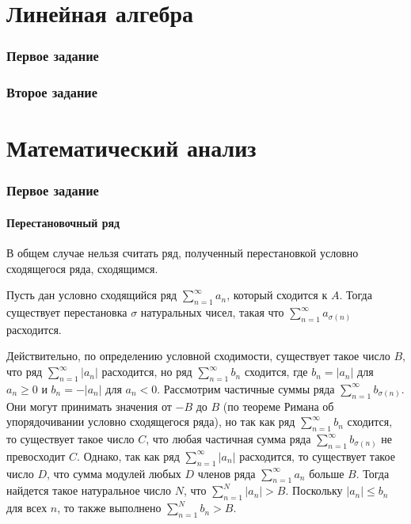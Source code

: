 \documentclass[a4paper, 14pt]{article}
\begin{document}
    \tableofcontents

     \part*{Линейная алгебра}

     \section*{Первое задание}

    

    \section*{Второе задание}

    

     \part*{Математический анализ}

    \section*{Первое задание} 

     \subsection*{Перестановочный ряд}

    В общем случае нельзя считать ряд, полученный перестановкой условно сходящегося ряда, сходящимся.

    Пусть дан условно сходящийся ряд $\sum_{n=1}^{\infty} a_n$, который сходится к $A$.
    Тогда существует перестановка $\sigma$ натуральных чисел, такая что $\sum_{n=1}^{\infty} a_{\sigma(n)}$ расходится.

    Действительно, по определению условной сходимости, существует такое число $B$, что ряд $\sum_{n=1}^{\infty} |a_n|$
    расходится, но ряд $\sum_{n=1}^{\infty} b_n$ сходится, где $b_n = |a_n|$ для $a_n \geq 0$ и $b_n = -|a_n|$ для $a_n < 0$.
    Рассмотрим частичные суммы ряда $\sum_{n=1}^{\infty} b_{\sigma(n)}$.
    Они могут принимать значения от $-B$ до $B$ (по теореме Римана об упорядочивании условно сходящегося ряда), но
    так как ряд $\sum_{n=1}^{\infty} b_n$ сходится, то существует такое число $C$, что любая частичная сумма ряда
    $\sum_{n=1}^{\infty} b_{\sigma(n)}$ не превосходит $C$.
    Однако, так как ряд $\sum_{n=1}^{\infty} |a_n|$ расходится, то существует такое число $D$, что сумма модулей
    любых $D$ членов ряда $\sum_{n=1}^{\infty} a_n$ больше $B$.
    Тогда найдется такое натуральное число $N$, что $\sum_{n=1}^{N} |a_n| > B$.
    Поскольку $|a_n| \leq b_n$ для всех $n$, то также выполнено $\sum_{n=1}^{N} b_n > B$.
\end{document}
